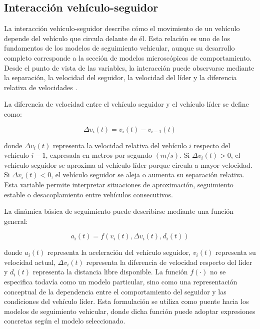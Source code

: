 \subsection{Interacción vehículo-seguidor}
\label{subsubsec:interaccion_vehiculo_seguidor}

La interacción vehículo-seguidor describe cómo el movimiento de un vehículo depende del vehículo que circula delante de él. Esta relación es uno de los fundamentos de los modelos de seguimiento vehicular, aunque su desarrollo completo corresponde a la sección de modelos microscópicos de comportamiento. Desde el punto de vista de las variables, la interacción puede observarse mediante la separación, la velocidad del seguidor, la velocidad del líder y la diferencia relativa de velocidades \cite{immers2005trafficflow,fhwa2001trafficflow}.

La diferencia de velocidad entre el vehículo seguidor y el vehículo líder se define como:

\begin{equation}
\Delta v_i(t)=v_i(t)-v_{i-1}(t)
\label{eq:diferencia_velocidad}
\end{equation}

donde \(\Delta v_i(t)\) representa la velocidad relativa del vehículo \(i\) respecto del vehículo \(i-1\), expresada en metros por segundo \((m/s)\). Si \(\Delta v_i(t)>0\), el vehículo seguidor se aproxima al vehículo líder porque circula a mayor velocidad. Si \(\Delta v_i(t)<0\), el vehículo seguidor se aleja o aumenta su separación relativa. Esta variable permite interpretar situaciones de aproximación, seguimiento estable o desacoplamiento entre vehículos consecutivos.

La dinámica básica de seguimiento puede describirse mediante una función general:

\begin{equation}
a_i(t)=f\left(v_i(t), \Delta v_i(t), d_i(t)\right)
\label{eq_interaccion_seguidor_general}
\end{equation}

donde \(a_i(t)\) representa la aceleración del vehículo seguidor, \(v_i(t)\) representa su velocidad actual, \(\Delta v_i(t)\) representa la diferencia de velocidad respecto del líder y \(d_i(t)\) representa la distancia libre disponible. La función \(f(\cdot)\) no se especifica todavía como un modelo particular, sino como una representación conceptual de la dependencia entre el comportamiento del seguidor y las condiciones del vehículo líder. Esta formulación se utiliza como puente hacia los modelos de seguimiento vehicular, donde dicha función puede adoptar expresiones concretas según el modelo seleccionado.

